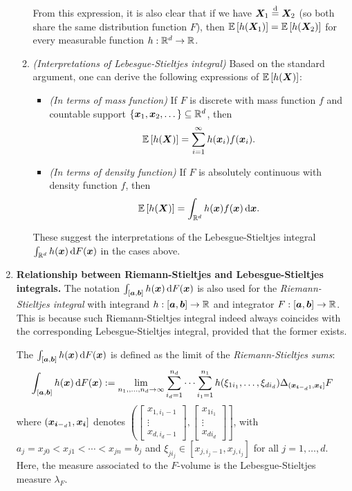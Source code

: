 \begin{enumerate}
\begin{enumerate}
From this expression, it is also clear that if we have \(\bm{X}_1\overset{\text{d}}=
\bm{X}_2\) (so both share the same distribution function \(F\)), then
\(\mathbb{E}\left[h(\bm{X}_1)\right]=\mathbb{E}\left[h(\bm{X}_2)\right]\) for every measurable function
\(h:\mathbb{R}^d\to\mathbb{R}\).
\item \emph{(Interpretations of Lebesgue-Stieltjes integral)}
Based on the standard argument, one can derive the following expressions of
\(\mathbb{E}\left[h(\bm{X})\right]\):
\begin{itemize}
\item \emph{(In terms of mass function)} If \(F\) is discrete with mass
function \(f\) and countable support
\(\{\bm{x}_1,\bm{x}_2,\dotsc\}\subseteq \mathbb{R}^d\), then
\[
\mathbb{E}\left[h(\bm{X})\right]=\sum_{i=1}^{\infty}h(\bm{x}_i)f(\bm{x}_i).
\]
\item \emph{(In terms of density function)} If \(F\) is absolutely continuous
with density function \(f\), then
\[
\expv{h(\vect{X})}=\int_{\R^d}^{}h(\vect{x})f(\vect{x})\odif{\vect{x}}.
\]
\end{itemize}
These suggest the interpretations of the Lebesgue-Stieltjes integral
\(\int_{\R^d}^{}h(\vect{x})\odif{F(\vect{x})}\) in the cases above.
\end{enumerate}
\item \textbf{Relationship between Riemann-Stieltjes and Lebesgue-Stieltjes integrals.}
The notation \(\int_{[\vect{a},\vect{b}]}^{}h(\vect{x})\odif{F(\vect{x})}\) is
also used for the \emph{Riemann-Stieltjes integral} with integrand
\(h:[\bm{a},\bm{b}]\to\mathbb{R}\) and integrator \(F:[\bm{a},\bm{b}]\to\mathbb{R}\).
This is because such Riemann-Stieltjes integral indeed always coincides with the
corresponding Lebesgue-Stieltjes integral, provided that the former exists.

The 
\(\int_{[\vect{a},\vect{b}]}^{}h(\vect{x})\odif{F(\vect{x})}\) is defined as
the limit of the \emph{Riemann-Stieltjes sums}:
\[
\int_{[\vect{a},\vect{b}]}^{}h(\vect{x})\odif{F(\vect{x})}
:=\lim_{n_1,,\dotsc,n_d\to\infty}\sum_{i_d=1}^{n_d}\dotsb\sum_{i_1=1}^{n_1}h(\xi_{1i_1},\dotsc,\xi_{di_{d}})
\Delta_{(\vect{x}_{\vect{i}-{}_{d}1},\vect{x}_{\vect{i}}]}F
\]
where \((\bm{x}_{\bm{i}-{}_{d}1},\bm{x}_{\bm{i}}]\) denotes \(\left(
\begin{bmatrix}x_{1,i_1-1}\\\vdots\\ x_{d,i_d-1}\end{bmatrix},
\begin{bmatrix}x_{1i_1}\\\vdots\\ x_{di_d}\end{bmatrix}
\right]\), with \(a_j=x_{j0}<x_{j1}<\dotsb<x_{jn}=b_j\) and
\(\xi_{ji_j}\in[x_{j,i_j-1},x_{j,i_j}]\) for all \(j=1,\dotsc,d\).
Here, the measure associated to the \(F\)-volume is the Lebesgue-Stieltjes
measure \(\lambda_{F}\).


\end{enumerate}

